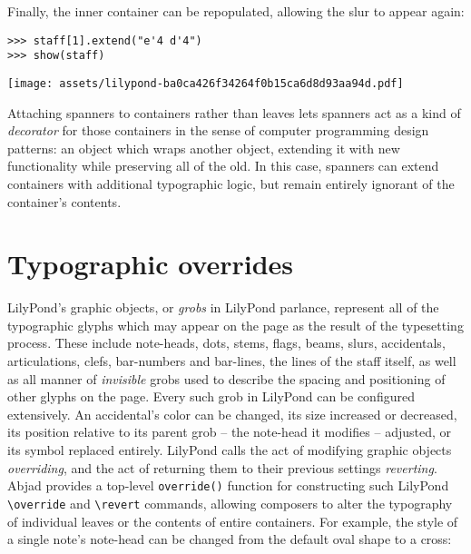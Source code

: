 \noindent Finally, the inner container can be repopulated, allowing the slur to
appear again:

\begin{comment}
<abjad>
staff[1].extend("e'4 d'4")
show(staff)
</abjad>
\end{comment}

\begin{abjadbookoutput}
\begin{singlespacing}
\vspace{-0.5\baselineskip}
\begin{verbatim}
>>> staff[1].extend("e'4 d'4")
>>> show(staff)
\end{verbatim}
\noindent\texttt{[image: assets/lilypond-ba0ca426f34264f0b15ca6d8d93aa94d.pdf]}
\end{singlespacing}
\end{abjadbookoutput}

\noindent Attaching spanners to containers rather than leaves lets spanners act
as a kind of \emph{decorator} for those containers in the sense of computer
programming design patterns: an object which wraps another object, extending it
with new functionality while preserving all of the old. In this case, spanners
can extend containers with additional typographic logic, but remain entirely
ignorant of the container's contents.

\section{Typographic overrides}
\label{sec:typographic-overrides}

LilyPond's graphic objects, or \emph{grobs} in LilyPond parlance, represent all
of the typographic glyphs which may appear on the page as the result of the
typesetting process. These include note-heads, dots, stems, flags, beams,
slurs, accidentals, articulations, clefs, bar-numbers and bar-lines, the lines
of the staff itself, as well as all manner of \emph{invisible} grobs used
to describe the spacing and positioning of other glyphs on the page. Every such
grob in LilyPond can be configured extensively. An accidental's color can be
changed, its size increased or decreased, its position relative to its parent
grob -- the note-head it modifies -- adjusted, or its symbol replaced entirely.
LilyPond calls the act of modifying graphic objects \emph{overriding}, and the
act of returning them to their previous settings \emph{reverting}. Abjad
provides a top-level \texttt{override()} function for constructing such
LilyPond \texttt{\textbackslash{}override} and \texttt{\textbackslash{}revert}
commands, allowing composers to alter the typography of individual leaves or
the contents of entire containers. For example, the style of a single note's
note-head can be changed from the default oval shape to a cross:

